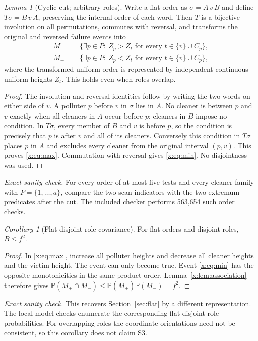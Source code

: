 \documentclass[11pt,a4paper]{article}
\theoremstyle{definition}\newtheorem{definition}[theorem]{Definition}
\theoremstyle{remark}\newtheorem{remark}[theorem]{Remark}
\newtheorem{xlemma}[xtheorem]{Lemma}
\newtheorem{xcorollary}[xtheorem]{Corollary}
\theoremstyle{definition}\newtheorem{xexample}[xtheorem]{Example}\theoremstyle{plain}
\newcommand{\PP}{\mathbb P}\newcommand{\EE}{\mathbb E}\newcommand{\Cov}{\operatorname{Cov}}
\newcommand{\xcheck}[1]{\par\smallskip\textit{Exact sanity check.} #1\par}
\begin{document}
\begin{xlemma}[Cyclic cut; arbitrary roles]\label{x:lem:cut}
Write a flat order as $\sigma=A\,v\,B$ and define $T\sigma=B\,v\,A$, preserving the internal order of each word. Then $T$ is a bijective involution on all permutations, commutes with reversal, and transforms the original and reversed failure events into
\begin{align}
M_+&=\{\exists p\in P:\ Z_p> Z_t\text{ for every }t\in\{v\}\cup C_p\},\label{x:eq:max}\\
M_-&=\{\exists p\in P:\ Z_p< Z_t\text{ for every }t\in\{v\}\cup C_p\},\label{x:eq:min}
\end{align}
where the transformed uniform order is represented by independent continuous uniform heights $Z_t$. This holds even when roles overlap.
\end{xlemma}
\begin{proof}
The involution and reversal identities follow by writing the two words on either side of $v$. A polluter $p$ before $v$ in $\sigma$ lies in $A$. No cleaner is between $p$ and $v$ exactly when all cleaners in $A$ occur before $p$; cleaners in $B$ impose no condition. In $T\sigma$, every member of $B$ and $v$ is before $p$, so the condition is precisely that $p$ is after $v$ and all of its cleaners. Conversely this condition in $T\sigma$ places $p$ in $A$ and excludes every cleaner from the original interval $(p,v)$. This proves \eqref{x:eq:max}. Commutation with reversal gives \eqref{x:eq:min}. No disjointness was used.
\end{proof}
\xcheck{For every order of at most five tests and every cleaner family with $P=\{1,\ldots,a\}$, compare the two scan indicators with the two extremum predicates after the cut. The included checker performs 563,654 such order checks.}

\begin{xcorollary}[Flat disjoint-role covariance]\label{x:cor:flat}
For flat orders and disjoint roles, $B\le f^2$.
\end{xcorollary}
\begin{proof}
In \eqref{x:eq:max}, increase all polluter heights and decrease all cleaner heights and the victim height. The event can only become true. Event \eqref{x:eq:min} has the opposite monotonicities in the same product order. Lemma~\ref{x:lem:association} therefore gives $\PP(M_+\cap M_-)\le\PP(M_+)\PP(M_-)=f^2$.
\end{proof}
\xcheck{This recovers Section~\ref{sec:flat} by a different representation. The local-model checks enumerate the corresponding flat disjoint-role probabilities. For overlapping roles the coordinate orientations need not be consistent, so this corollary does not claim S3.}
\end{document}
